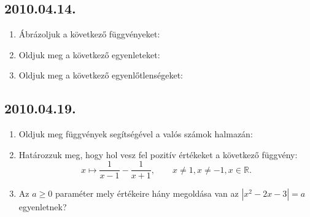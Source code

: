 \subsection*{2010.04.14.}
\begin{enumerate}
\item Ábrázoljuk a következő függvényeket:
\item Oldjuk meg a következő egyenleteket:
\item Oldjuk meg a következő egyenlőtlenségeket:
\end{enumerate}
\subsection*{2010.04.19.}
\begin{enumerate}
\item Oldjuk meg függvények segítségével a valós számok halmazán:
\item Határozzuk meg, hogy hol vesz fel pozitív értékeket a következő függvény:
$$x\mapsto \dfrac{1}{x-1}-\dfrac{1}{x+1},\qquad x\ne 1, x\ne -1, x\in \mathbb{R}.$$
\item Az $a\ge 0$ paraméter mely értékeire hány megoldása van az $|x^2-2x-3|=a$ egyenletnek?
\end{enumerate}
